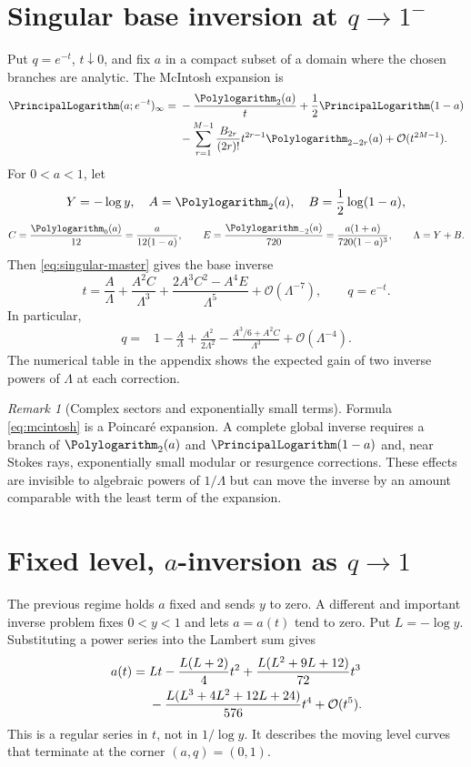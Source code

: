 \documentclass[11pt,oneside]{book}
\theoremstyle{definition}
\theoremstyle{remark}
\newtheorem{remark}[theorem]{Remark}
\newcommand{\OO}{\mathcal{O}}
\begin{document}
\section{Singular base inversion at $q\to1^-$}
Put $q=e^{-t}$, $t\downarrow0$, and fix $a$ in a compact subset of a domain
where the chosen branches are analytic.  The McIntosh expansion
\cite{McIntosh1999,DLMFq} is
\begin{align}
 \PrincipalLogarithm(a;e^{-t})_\infty
={}&-\frac{\Polylogarithm_2(a)}{t}+\frac12\PrincipalLogarithm(1-a)\notag\\
 &-\sum_{r=1}^{M-1}\frac{B_{2r}}{(2r)!}
 t^{2r-1}\Polylogarithm_{2-2r}(a)+\OO(t^{2M-1}).
 \label{eq:mcintosh}
\end{align}
For $0<a<1$, let
\[
 Y=-\log y,\quad
 A=\Polylogarithm_2(a),\quad B=\frac12\log(1-a),
\]
\[
 C=\frac{\Polylogarithm_0(a)}{12}=\frac{a}{12(1-a)},
 \qquad E=\frac{\Polylogarithm_{-2}(a)}{720}
 =\frac{a(1+a)}{720(1-a)^3},
 \qquad \Lambda=Y+B.
\]
Then \eqref{eq:singular-master} gives the base inverse
\begin{equation}\label{eq:qone-infinite-t-inverse}
 t=\frac{A}{\Lambda}
 +\frac{A^2C}{\Lambda^3}
 +\frac{2A^3C^2-A^4E}{\Lambda^5}
 +\OO(\Lambda^{-7}),
 \qquad q=e^{-t}.
\end{equation}
In particular,
\begin{align}
 q={}&1-\frac{A}{\Lambda}+\frac{A^2}{2\Lambda^2}
 -\frac{A^3/6+A^2C}{\Lambda^3}+\OO(\Lambda^{-4}).
 \label{eq:qone-infinite-q-inverse}
\end{align}
The numerical table in the appendix shows the expected gain of two inverse
powers of $\Lambda$ at each correction.

\begin{remark}[Complex sectors and exponentially small terms]
Formula \eqref{eq:mcintosh} is a Poincar\'e expansion.  A complete global
inverse requires a branch of $\Polylogarithm_2(a)$ and $\PrincipalLogarithm(1-a)$ and, near Stokes
rays, exponentially small modular or resurgence corrections.  These effects
are invisible to algebraic powers of $1/\Lambda$ but can move the inverse by an
amount comparable with the least term of the expansion.
\end{remark}

\section{Fixed level, $a$-inversion as $q\to1$}
The previous regime holds $a$ fixed and sends $y$ to zero.  A different and
important inverse problem fixes $0<y<1$ and lets $a=a(t)$ tend to zero.  Put
$L=-\log y$.  Substituting a power series into the Lambert sum gives
\begin{align}
 a(t)={}&Lt-\frac{L(L+2)}4t^2
 +\frac{L(L^2+9L+12)}{72}t^3\notag\\
 &-\frac{L(L^3+4L^2+12L+24)}{576}t^4
 +\OO(t^5).
 \label{eq:a-fixed-level-qone}
\end{align}
This is a regular series in $t$, not in $1/\log y$.  It describes the moving
level curves that terminate at the corner $(a,q)=(0,1)$.
\end{document}
